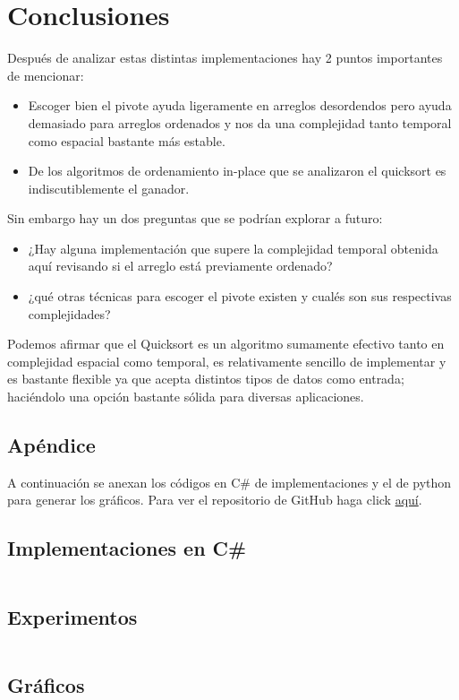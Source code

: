 \documentclass[conference]{IEEEtran}
\begin{document}
\section{Conclusiones}

Después de analizar estas distintas implementaciones hay 2 puntos importantes de mencionar:

\begin{itemize}
    \item Escoger bien el pivote ayuda ligeramente en arreglos desordendos pero ayuda demasiado para arreglos ordenados y nos da una complejidad tanto temporal como espacial bastante más estable.
    \item De los algoritmos de ordenamiento in-place que se analizaron el quicksort es indiscutiblemente el ganador.
\end{itemize}

Sin embargo hay un dos preguntas que se podrían explorar a futuro:
\begin{itemize}
    \item ¿Hay alguna implementación que supere la complejidad temporal obtenida aquí revisando si el arreglo está previamente ordenado? 
    \item ¿qué otras técnicas para escoger el pivote existen y cualés son sus respectivas complejidades?
\end{itemize}

Podemos afirmar que el Quicksort es un algoritmo sumamente efectivo tanto en complejidad espacial como temporal, es relativamente sencillo de implementar y es bastante flexible ya que acepta distintos tipos de datos como entrada; haciéndolo una opción bastante sólida para diversas aplicaciones.




\begin{@twocolumnfalse}
\newpage{}
\section{Apéndice}
A continuación se anexan los códigos en C\# de implementaciones y el de python para generar los gráficos. Para ver el repositorio de GitHub haga click \href{https://github.com/PabloNatB/Quicksort}{aquí}.

\subsection{Implementaciones en C\#}
\inputminted[breaklines=true]{csharp}{Qsort/Class1.cs}

\subsection{Experimentos}
\inputminted[breaklines=true]{csharp}{Qsort/Program.cs}

\subsection{Gráficos}
\inputminted[breaklines=true]{python}{graphs.py}
\end{@twocolumnfalse}
\end{document}
